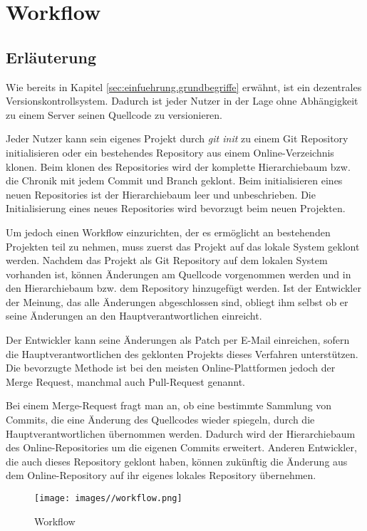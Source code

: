 \section{Workflow}
\label{sec:workflow}

\subsection{Erläuterung}
\label{sec:workflow.erlaeuterung}
Wie bereits in Kapitel \ref*{sec:einfuehrung.grundbegriffe} erwähnt, ist ein dezentrales Versionskontrollsystem. Dadurch ist jeder Nutzer in der Lage ohne Abhängigkeit zu einem Server seinen Quellcode zu versionieren.

Jeder Nutzer kann sein eigenes Projekt durch \textit{git init} zu einem Git Repository initialisieren oder ein bestehendes Repository aus einem Online-Verzeichnis klonen. Beim klonen des Repositories wird der komplette Hierarchiebaum bzw. die Chronik mit jedem Commit und Branch geklont. Beim initialisieren eines neuen Repositories ist der Hierarchiebaum leer und unbeschrieben. Die Initialisierung eines neues Repositories wird bevorzugt beim neuen Projekten.

Um jedoch einen Workflow einzurichten, der es ermöglicht an bestehenden Projekten teil zu nehmen, muss zuerst das Projekt auf das lokale System geklont werden. Nachdem das Projekt als Git Repository auf dem lokalen System vorhanden ist, können Änderungen am Quellcode vorgenommen werden und in den Hierarchiebaum bzw. dem Repository hinzugefügt werden. Ist der Entwickler der Meinung, das alle Änderungen abgeschlossen sind, obliegt ihm selbst ob er seine Änderungen an den Hauptverantwortlichen einreicht. 

Der Entwickler kann seine Änderungen als Patch per E-Mail einreichen, sofern die Hauptverantwortlichen des geklonten Projekts dieses Verfahren unterstützen. Die bevorzugte Methode ist bei den meisten Online-Plattformen jedoch der Merge Request, manchmal auch Pull-Request genannt. 

Bei einem Merge-Request fragt man an, ob eine bestimmte Sammlung von Commits, die eine Änderung des Quellcodes wieder spiegeln, durch die Hauptverantwortlichen übernommen werden. Dadurch wird der Hierarchiebaum des Online-Repositories um die eigenen Commits erweitert. Anderen Entwickler, die auch dieses Repository geklont haben, können zukünftig die Änderung aus dem Online-Repository auf ihr eigenes lokales Repository übernehmen.

\begin{figure}[h]
  \centering
  \label{img:workflow}
  \texttt{[image: images//workflow.png]}
  \caption{Workflow}
\end{figure}  


